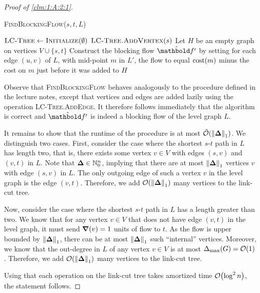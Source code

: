 \documentclass[nobib]{tufte-handout}
\begin{document}
\begin{proof}[Proof of \cref{clm:1:A:2:1}]
\begin{algorithm}
    \caption{\textsc{FindBlockingFlow($s, t, L$)}}\label{alg:1:A:1}
    $\textsc{LC-Tree} \gets \textsc{Initialize}(\emptyset)$\;
    $\textsc{LC-Tree.AddVertex}(s)$\;
    Let $H$ be an empty graph on vertices $V \cup \{s,t\}$\;
    Construct the blocking flow $\hat{\vf'}$ by setting for each edge $(u,v)$ of $L$, with mid-point $m$ in $L'$, the flow to equal $\mathrm{cost}(m)$ minus the cost on $m$ just before it was added to $H$\;
\end{algorithm}

Observe that \textsc{FindBlockingFlow} behaves analogously to the procedure defined in the lecture notes, except that vertices and edges are added lazily using the operation \textsc{LC-Tree.AddEdge}. It therefore follows immediately that the algorithm is correct and $\hat{\vf'}$ is indeed a blocking flow of the level graph $L$.

It remains to show that the runtime of the procedure is at most $\TildeLandauO{\norm{\vDelta}_1}$. We distinguish two cases. First, consider the case where the shortest $s$-$t$ path in $L$ has length two, that is, there exists some vertex $v \in V$ with edges $(s,v)$ and $(v,t)$ in $L$. Note that $\vDelta \in \Nat_0^n$, implying that there are at most $\norm{\vDelta}_1$ vertices $v$ with edge $(s,v)$ in $L$. The only outgoing edge of such a vertex $v$ in the level graph is the edge $(v,t)$. Therefore, we add $\LandauO{\norm{\vDelta}_1}$ many vertices to the link-cut tree.

Now, consider the case where the shortest $s$-$t$ path in $L$ has a length greater than two. We know that for any vertex $v \in V$ that does not have edge $(v,t)$ in the level graph, it must send $\boldsymbol{\nabla}(v) = 1$ units of flow to $t$. As the flow is upper bounded by $\norm{\vDelta}_1$, there can be at most $\norm{\vDelta}_1$ such ``internal'' vertices. Moreover, we know that the out-degree in $L$ of any vertex $v \in V$ is at most $\Delta_{\max}(G) = \LandauO{1}$. Therefore, we add $\LandauO{\norm{\vDelta}_1}$ many vertices to the link-cut tree.

Using that each operation on the link-cut tree takes amortized time $\LandauO{\log^2 n}$, the statement follows.
\end{proof}
\end{document}
